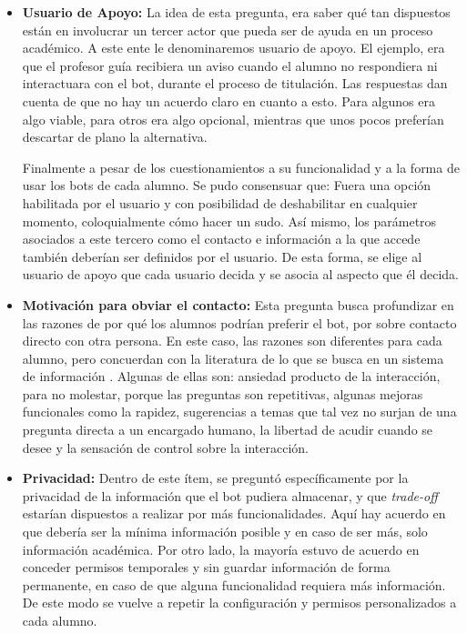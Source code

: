 \begin{itemize}
        \item \textbf{Usuario de Apoyo:} La idea de esta pregunta, era saber qué tan dispuestos están en involucrar un tercer actor que pueda ser de ayuda en un proceso académico.  A este ente le denominaremos usuario de apoyo. El ejemplo, era que el profesor guía recibiera un aviso cuando el alumno no respondiera ni interactuara con el bot, durante el proceso de titulación. Las respuestas dan cuenta de que no hay un acuerdo claro en cuanto a esto. Para algunos era algo viable, para otros era algo opcional, mientras que unos pocos preferían descartar de plano la alternativa.
        \par Finalmente a pesar de los cuestionamientos a su funcionalidad y a la forma de usar los bots de cada alumno. Se pudo consensuar que: Fuera una opción habilitada por el usuario y con posibilidad de deshabilitar en cualquier momento, coloquialmente  \guillemotleft cómo hacer un sudo\guillemotright. Así mismo, los parámetros asociados a este tercero como el contacto e información a la que accede también deberían ser definidos por el usuario. De esta forma, se elige al usuario de apoyo que cada usuario decida y se asocia al aspecto que él decida.

        \item \textbf{Motivación para obviar el contacto:} Esta pregunta busca profundizar en las razones de por qué los alumnos podrían preferir el bot, por sobre contacto directo con otra persona. En este caso, las razones son diferentes para cada alumno, pero concuerdan con la literatura de lo que se busca en un sistema de información \cite{Thurman}. Algunas de ellas son: ansiedad producto de la interacción, para no molestar, porque las preguntas son repetitivas, algunas mejoras funcionales como la rapidez, sugerencias a temas que tal vez no surjan de una pregunta directa a un encargado humano, la libertad de acudir cuando se desee y la sensación de control sobre la interacción.
        
        \item \textbf{Privacidad:} Dentro de este ítem, se preguntó específicamente por la privacidad de la información que el bot pudiera almacenar, y que \textit{trade-off} estarían dispuestos a realizar por más funcionalidades. Aquí hay acuerdo en que debería ser la mínima información posible y en caso de ser más, solo información académica. Por otro lado, la mayoría estuvo de acuerdo en conceder permisos temporales y sin guardar información de forma permanente, en caso de que alguna funcionalidad requiera más información. De este modo se vuelve a repetir la configuración y permisos personalizados a cada alumno.
        

\end{itemize}
